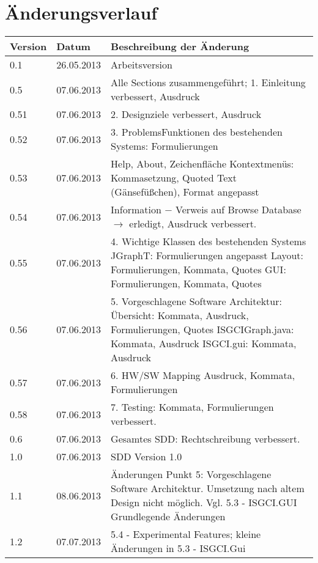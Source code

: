 \documentclass[10pt,a4paper]{article}
\begin{document}
\section{Änderungsverlauf}
\hspace*{-1cm}
\begin{tabular}{|l|l|p{10.5cm}|}\hline
 \textbf{Version}&\textbf{Datum}&\textbf{Beschreibung der \"Anderung}\\\hline
 0.1&26.05.2013&Arbeitsversion\\\hline
 0.5& 07.06.2013 & Alle Sections zusammengeführt; 1. Einleitung verbessert, Ausdruck\\\hline
 0.51& 07.06.2013 & 2. Designziele verbessert, Ausdruck\\\hline
 0.52& 07.06.2013 & 3. ProblemsFunktionen des bestehenden Systems: Formulierungen\\\hline
 0.53& 07.06.2013 & Help, About, Zeichenfläche Kontextmenüs: Kommasetzung, Quoted Text (Gänsefüßchen), Format angepasst\\\hline
 0.54& 07.06.2013 & Information $-$ Verweis auf Browse Database $\rightarrow$ erledigt, \newline
 			      Ausdruck verbessert.\\\hline
 0.55& 07.06.2013 & 4. {Wichtige Klassen des bestehenden Systems}\newline
 				  JGraphT: Formulierungen angepasst\newline
 				  Layout: Formulierungen, Kommata, Quotes      \newline 
 				  GUI: Formulierungen, Kommata, Quotes\\\hline 
 0.56& 07.06.2013 & 5. Vorgeschlagene Software Architektur: \newline
 				  5.1 Übersicht: Kommata, Ausdruck, Formulierungen, Quotes\newline
 				  5.2 ISGCIGraph.java: Kommata, Ausdruck\newline
 				  5.3 ISGCI.gui: Kommata, Ausdruck\\\hline
 0.57& 07.06.2013 & 6. HW/SW Mapping \newline
 					Ausdruck, Kommata, Formulierungen\\\hline
 0.58& 07.06.2013 & 7. Testing: Kommata, Formulierungen verbessert.\\\hline
 0.6& 07.06.2013 & Gesamtes SDD: Rechtschreibung verbessert.\\\hline
 1.0& 07.06.2013 & SDD Version 1.0 \\\hline
 1.1& 08.06.2013 & Änderungen Punkt 5: Vorgeschlagene Software Architektur. \newline Umsetzung nach altem Design nicht möglich. \newline Vgl. 5.3 - ISGCI.GUI Grundlegende Änderungen\\\hline
  1.2& 07.07.2013 & 5.4 - Experimental Features; kleine Änderungen in 5.3 - ISGCI.Gui \\\hline
\end{tabular}\\
\vfill
\end{document}
